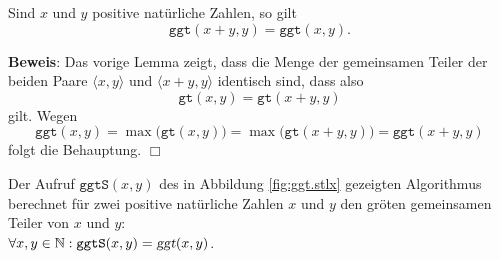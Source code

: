 \begin{Korollar} \label{korollar:ggt}
Sind $x$ und $y$ positive nat\"{u}rliche Zahlen, so gilt
\[ \texttt{ggt}(x + y, y) = \texttt{ggt}(x,y). \]  
\end{Korollar}

\noindent
\textbf{Beweis}: Das vorige Lemma zeigt, dass die Menge der gemeinsamen Teiler
der beiden Paare $\langle x, y \rangle$ und $\langle x + y, y \rangle$ identisch sind,
dass also 
\[ \texttt{gt}(x,y) = \texttt{gt}(x + y, y) \]
gilt.  Wegen
\[ \texttt{ggt}(x,y) = \max\bigl(\texttt{gt}(x,y)\bigr) = \max\bigl(\texttt{gt}(x+y,y)\bigr)
   = \texttt{ggt}(x+y,y)
\]
folgt die Behauptung. \hspace*{\fill} $\Box$


\begin{Satz} \label{satz:euklid_korrekt}
Der Aufruf $\texttt{ggtS}(x, y)$ des in Abbildung \ref{fig:ggt.stlx} gezeigten Algorithmus berechnet 
f\"{u}r zwei positive nat\"{u}rliche Zahlen $x$ und $y$ den gr\"{o}\3ten gemeinsamen Teiler von $x$ und $y$:
\\[0.2cm]
\hspace*{1.3cm}
$\forall x, y \in \mathbb{N}: \mathtt{ggtS}(x, y) = \textsl{ggt}(x,y)$.
\end{Satz}

